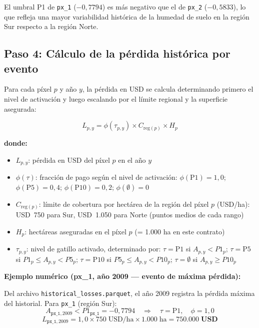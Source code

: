 \documentclass[11pt,a4paper]{article}
\begin{document}
El umbral P1 de \texttt{px\_1} ($-0{,}7794$) es más negativo que el de \texttt{px\_2} ($-0{,}5833$), lo que refleja una mayor variabilidad histórica de la humedad de suelo en la región Sur respecto a la región Norte.

\subsection{Paso 4: Cálculo de la pérdida histórica por evento}
\label{sec:perdidas}

Para cada píxel $p$ y año $y$, la pérdida en USD se calcula determinando primero el nivel de activación y luego escalando por el límite regional y la superficie asegurada:

\begin{equation}
  L_{p,y} = \phi(\tau_{p,y}) \times C_{\text{reg}(p)} \times H_p
\end{equation}

\textbf{donde:}
\begin{itemize}
  \item $L_{p,y}$: pérdida en USD del píxel $p$ en el año $y$
  \item $\phi(\tau)$: fracción de pago según el nivel de activación: $\phi(\text{P1}) = 1{,}0$;\; $\phi(\text{P5}) = 0{,}4$;\; $\phi(\text{P10}) = 0{,}2$;\; $\phi(\emptyset) = 0$
  \item $C_{\text{reg}(p)}$: límite de cobertura por hectárea de la región del píxel $p$ (USD/ha): USD~750 para Sur, USD~1.050 para Norte (puntos medios de cada rango)
  \item $H_p$: hectáreas aseguradas en el píxel $p$ (= 1.000 ha en este contrato)
  \item $\tau_{p,y}$: nivel de gatillo activado, determinado por: $\tau = \text{P1}$ si $A_{p,y} < P1_p$; $\tau = \text{P5}$ si $P1_p \le A_{p,y} < P5_p$; $\tau = \text{P10}$ si $P5_p \le A_{p,y} < P10_p$; $\tau = \emptyset$ si $A_{p,y} \ge P10_p$
\end{itemize}

\textbf{Ejemplo numérico (px\_1, año 2009 --- evento de máxima pérdida):}

Del archivo \texttt{historical\_losses.parquet}, el año 2009 registra la pérdida máxima del historial. Para \texttt{px\_1} (región Sur):
\[
  A_{\texttt{px\_1}, 2009} < P1_{\texttt{px\_1}} = -0{,}7794
  \quad\Rightarrow\quad \tau = \text{P1},\quad \phi = 1{,}0
\]
\[
  L_{\texttt{px\_1}, 2009} = 1{,}0 \times 750\;\text{USD/ha} \times 1.000\;\text{ha} = \mathbf{750.000\;\text{USD}}
\]
\end{document}
